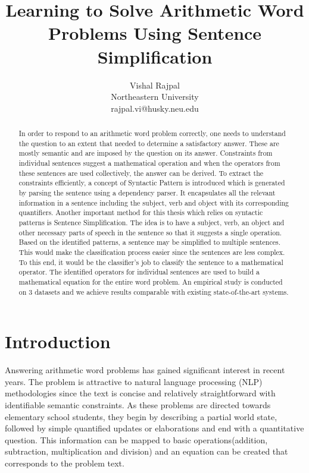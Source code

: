 \documentclass[11pt]{article}
\begin{document}
\nocite{Murphy, Wasserman, Hastie}

\title{Learning to Solve Arithmetic Word Problems Using Sentence Simplification}
\author{
	Vishal Rajpal\\
	Northeastern University\\
	rajpal.vi@husky.neu.edu\\
}
\date{}
\maketitle

\begin{abstract}
In order to respond to an arithmetic word problem correctly, one needs to understand the question to an extent that needed to determine a satisfactory answer. These are mostly semantic and are imposed by the question on its answer. Constraints from individual sentences suggest a mathematical operation and when the operators from these sentences are used collectively, the answer can be derived. To extract the constraints efficiently, a concept of Syntactic Pattern is introduced which is generated by parsing the sentence using a dependency parser. It encapsulates all the relevant information in a sentence including the subject, verb and object with its corresponding quantifiers. Another important method for this thesis which relies on syntactic patterns is Sentence Simplification. The idea is to have a subject, verb, an object and other necessary parts of speech in the sentence so that it suggests a single operation. Based on the identified patterns, a sentence may be simplified to multiple sentences. This would make the classification process easier since the sentences are less complex. To this end, it would be the classifier's job to classify the sentence to a mathematical operator. The identified operators for individual sentences are used to build a mathematical equation for the entire word problem. An empirical study is conducted on 3 datasets and we achieve results comparable with existing state-of-the-art systems.
\end{abstract}

\section{Introduction} \label{sec:introduction}
Answering arithmetic word problems has gained significant interest in recent years. The problem is attractive to natural language processing (NLP) methodologies  since the text is concise and relatively straightforward with identifiable semantic constraints. As these problems are directed towards elementary school students, they begin by describing a partial world state, followed by simple quantified updates or elaborations and end with a quantitative question. This information can be mapped to basic operations(addition, subtraction, multiplication and division) and an equation can be created that corresponds to the problem text. 
\end{document}
